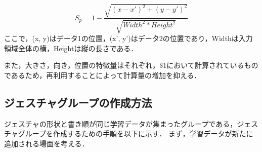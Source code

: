 \begin{equation}
S_\textit{p} = 1 - \frac{\sqrt{(x - x')^2 + (y - y')^2}}{\sqrt{W\!idt\!h^2 * H\!ei\!ght^2}}
\end{equation}
ここで，(x, y)はデータ1の位置，(x', y')はデータ2の位置であり，Widthは入力領域全体の横，Heightは縦の長さである．

また，大きさ，向き，位置の特徴量はそれぞれ，\$1において計算されているものであるため，再利用することによって計算量の増加を抑える．

\subsection{ジェスチャグループの作成方法}
ジェスチャの形状と書き順が同じ学習データが集まったグループである，ジェスチャグループを作成するための手順を以下に示す．
まず，学習データが新たに追加される場面を考える．
